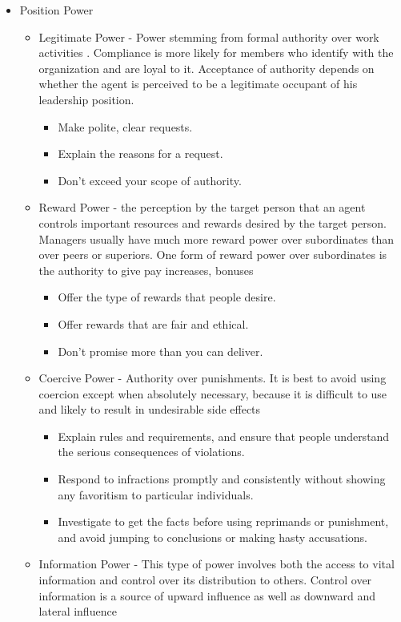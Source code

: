 \begin{itemize}
	\item Position Power
	\begin{itemize}
		\item Legitimate Power - Power stemming from formal authority over work activities . Compliance is more likely for members who identify with the organization and are loyal to it. Acceptance of authority depends on whether the agent is perceived to be a legitimate occupant of his leadership position.
			\begin{itemize}
				\item Make polite, clear requests.
				\item Explain the reasons for a request.
				\item Don’t exceed your scope of authority.
			\end{itemize}
		\item Reward Power - the perception by the target person that an agent controls important resources and rewards desired by the target person. Managers usually have much more reward power over subordinates than over peers or superiors. One form of reward power over subordinates is the authority to give pay increases, bonuses
			\begin{itemize}
				\item Offer the type of rewards that people desire.
				\item Offer rewards that are fair and ethical.
				\item Don’t promise more than you can deliver.
			\end{itemize}
		\item Coercive Power - Authority over punishments. It is best to avoid using coercion except when absolutely necessary, because it is difficult to use and likely to result in undesirable side effects
			\begin{itemize}
				\item Explain rules and requirements, and ensure that people understand the serious consequences of violations.
				\item Respond to infractions promptly and consistently without showing any favoritism to particular individuals.
				\item Investigate to get the facts before using reprimands or punishment, and avoid jumping to conclusions or making hasty accusations.
			\end{itemize}
		\item Information Power - This type of power involves both the access to vital information and control over its distribution to others. Control over information is a source of upward influence as well as downward and lateral influence

\end{itemize}
\end{itemize}
